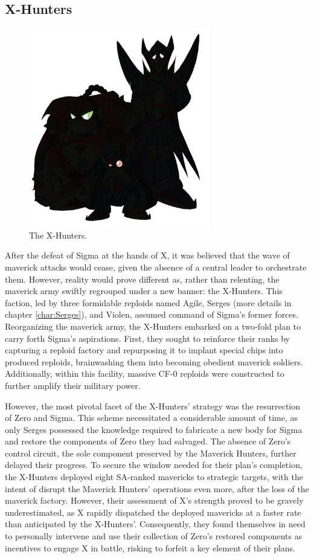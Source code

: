\subsection{X-Hunters}
\begin{figure}[htp]
	\centering
	\includegraphics[height=\portraitsize]{figures/X2/Enemies/X_Hunters.jpg}
	\caption{The X-Hunters.}
\end{figure}

After the defeat of Sigma at the hands of X, it was believed that the wave of maverick attacks would cease, given the absence of a central leader to orchestrate them. However, reality would prove different as, rather than relenting, the maverick army swiftly regrouped under a new banner: the X-Hunters. This faction, led by three formidable reploids named Agile, Serges (more details in chapter \ref{char:Serges}), and Violen, assumed command of Sigma's former forces. Reorganizing the maverick army, the X-Hunters embarked on a two-fold plan to carry forth Sigma's aspirations. First, they sought to reinforce their ranks by capturing a reploid factory and repurposing it to implant special chips into produced reploids, brainwashing them into becoming obedient maverick soldiers. Additionally, within this facility, massive CF-0 reploids were constructed to further amplify their military power.

However, the most pivotal facet of the X-Hunters' strategy was the resurrection of Zero and Sigma. This scheme necessitated a considerable amount of time, as only Serges possessed the knowledge required to fabricate a new body for Sigma and restore the components of Zero they had salvaged. The absence of Zero's control circuit, the sole component preserved by the Maverick Hunters, further delayed their progress. To secure the window needed for their plan's completion, the X-Hunters deployed eight SA-ranked mavericks to strategic targets, with the intent of disrupt the Maverick Hunters' operations even more, after the loss of the maverick factory. However, their assessment of X's strength proved to be gravely underestimated, as X rapidly dispatched the deployed mavericks at a faster rate than anticipated by the X-Hunters'. Consequently, they found themselves in need to personally intervene and use their collection of Zero's restored components as incentives to engage X in battle, risking to forfeit a key element of their plans.

